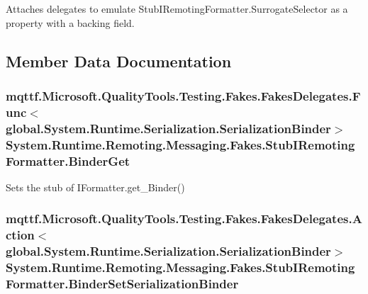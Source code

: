 Attaches delegates to emulate Stub\-I\-Remoting\-Formatter.\-Surrogate\-Selector as a property with a backing field.



\subsection{Member Data Documentation}
\hypertarget{class_system_1_1_runtime_1_1_remoting_1_1_messaging_1_1_fakes_1_1_stub_i_remoting_formatter_a4976f8ab0fe1e454d29d12ccabdc4bbf}{
\subsubsection[{Binder\-Get}]{\setlength{\rightskip}{0pt plus 5cm}mqttf.\-Microsoft.\-Quality\-Tools.\-Testing.\-Fakes.\-Fakes\-Delegates.\-Func$<$global.\-System.\-Runtime.\-Serialization.\-Serialization\-Binder$>$ System.\-Runtime.\-Remoting.\-Messaging.\-Fakes.\-Stub\-I\-Remoting\-Formatter.\-Binder\-Get}}\label{class_system_1_1_runtime_1_1_remoting_1_1_messaging_1_1_fakes_1_1_stub_i_remoting_formatter_a4976f8ab0fe1e454d29d12ccabdc4bbf}


Sets the stub of I\-Formatter.\-get\-\_\-\-Binder()

\hypertarget{class_system_1_1_runtime_1_1_remoting_1_1_messaging_1_1_fakes_1_1_stub_i_remoting_formatter_aa34127514fb539c8806ea0e1c717f7be}{
\subsubsection[{Binder\-Set\-Serialization\-Binder}]{\setlength{\rightskip}{0pt plus 5cm}mqttf.\-Microsoft.\-Quality\-Tools.\-Testing.\-Fakes.\-Fakes\-Delegates.\-Action$<$global.\-System.\-Runtime.\-Serialization.\-Serialization\-Binder$>$ System.\-Runtime.\-Remoting.\-Messaging.\-Fakes.\-Stub\-I\-Remoting\-Formatter.\-Binder\-Set\-Serialization\-Binder}}\label{class_system_1_1_runtime_1_1_remoting_1_1_messaging_1_1_fakes_1_1_stub_i_remoting_formatter_aa34127514fb539c8806ea0e1c717f7be}


